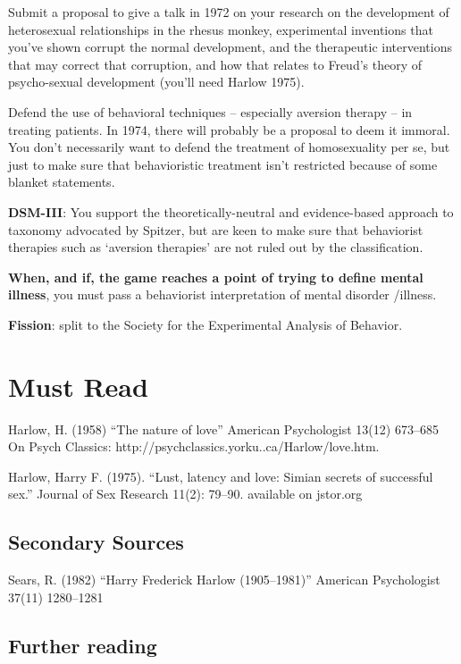 \begin{refsection}
Submit a proposal to give a talk in 1972 on your research on the development of heterosexual relationships in the rhesus monkey, experimental inventions that you've shown corrupt the normal development, and the therapeutic interventions that may correct that corruption, and how that relates to Freud's theory of psycho-sexual development (you'll need Harlow 1975).

Defend the use of behavioral techniques – especially aversion therapy – in treating patients. In 1974, there will probably be a proposal to deem it immoral. You don't necessarily want to defend the treatment of homosexuality per se, but just to make sure that behavioristic treatment isn't restricted because of some blanket statements.

\textbf{DSM-III}: You support the theoretically-neutral and evidence-based approach to taxonomy advocated by Spitzer, but are keen to make sure that behaviorist therapies such as `aversion therapies' are not ruled out by the classification.

\textbf{When, and if, the game reaches a point of trying to define mental illness}, you must pass a behaviorist interpretation of mental disorder \slash  illness.

\textbf{Fission}: split to the Society for the Experimental Analysis of Behavior.

\section{Must Read}
\label{mustread}

Harlow, H. (1958) ``The nature of love'' American Psychologist 13(12) 673--685 On Psych Classics: http:\slash \slash psychclassics.yorku..ca\slash Harlow\slash love.htm.

Harlow, Harry F. (1975). ``Lust, latency and love: Simian secrets of successful sex.'' Journal of Sex Research 11(2): 79--90. available on jstor.org

\subsection{Secondary Sources}
\label{secondarysources}

Sears, R. (1982) ``Harry Frederick Harlow (1905--1981)'' American Psychologist 37(11) 1280--1281

\subsection{Further reading}
\label{furtherreading}


\end{refsection}
